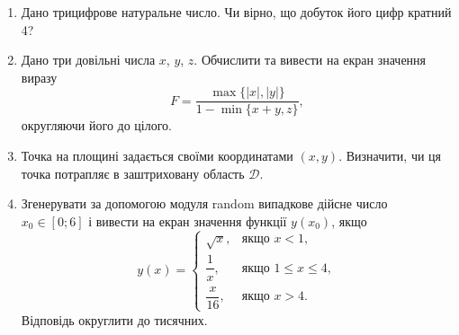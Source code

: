\cleardoublepage


\begin{enumerate}
\item Дано трицифрове натуральне число. Чи вірно, що добуток його цифр кратний 4?

\item Дано три довільні числа $x$, $y$, $z$. Обчислити та вивести на екран значення виразу
$$
F=\frac{\max\{|x|, |y|\}}{1-\min\{x+y, z\}},
$$
округляючи його до цілого.

\item Точка на площині задається своїми координатами $(x, y)$. Визначити, чи ця точка потрапляє в заштриховану область $\mathcal{D}$.
\begin{center}
\end{center}

\item Згенерувати за допомогою модуля {\ttfamily random} випадкове дійсне число $x_0\in [0; 6]$ і вивести на екран значення функції $y(x_0)$, якщо
$$
y(x)=\begin{cases}\sqrt{x}, & \mbox{якщо } x<1, \\
\dfrac{1}{x}, & \mbox{якщо } 1\leqslant x\leqslant 4, \\
\dfrac{x}{16}, & \mbox{якщо } x>4.
\end{cases}
$$
Відповідь округлити до тисячних.
\end{enumerate}

